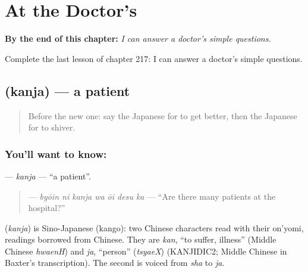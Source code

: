 
\chapter{At the Doctor's}
\label{ch:ja-at-the-doctor-s}

\begin{chapteropening}
\textbf{By the end of this chapter:} \emph{I can answer a doctor's simple questions.}

Complete the last lesson of chapter 217: I can answer a doctor's simple questions.
\end{chapteropening}

\section[\texorpdfstring{\ja{かんじゃ} (kanja)}{かんじゃ (kanja)}]{ (kanja) — a patient}

\label{lesson:JA-C217-kanja}



\begin{quote}
Before the new one: say the Japanese for to get better, then the Japanese for to shiver.
\end{quote}

\subsection*{You'll want to know: }
\textbf{} — \emph{kanja} — \textquotedblleft{}a patient\textquotedblright{}.

\begin{quote}
\textbf{  } — \emph{byōin ni kanja wa ōi desu ka} — \textquotedblleft{}Are there many patients at the hospital?\textquotedblright{}
\end{quote}

\begin{cousinweb}
\textbf{} (\emph{kanja}) is Sino-Japanese (kango): two Chinese characters read with their on'yomi, readings borrowed from Chinese. They are \emph{kan}, \textquotedblleft{}to suffer, illness\textquotedblright{} (Middle Chinese \emph{hwaenH}) and \emph{ja}, \textquotedblleft{}person\textquotedblright{} (\emph{tsyaeX}) (KANJIDIC2; Middle Chinese in Baxter's transcription). The second is voiced from \emph{sha} to \emph{ja}.
\end{cousinweb}

